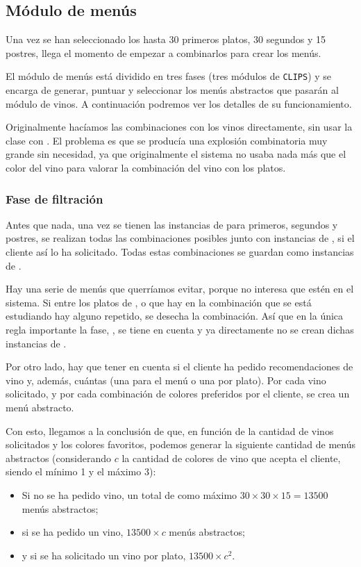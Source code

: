 % 

\subsection{Módulo de menús}
Una vez se han seleccionado los hasta 30 primeros platos, 30 segundos y 15
postres, llega el momento de empezar a combinarlos para crear los menús.

El módulo de menús está dividido en tres fases (tres módulos de \texttt{CLIPS})
y se encarga de generar, puntuar y seleccionar los menús abstractos que pasarán
al módulo de vinos. A continuación podremos ver los detalles de su
funcionamiento.

Originalmente hacíamos las combinaciones con los vinos directamente, sin usar
la clase  con . El problema es que se
producía una explosión combinatoria muy grande sin necesidad, ya que
originalmente el sistema no usaba nada más que el color del vino para valorar
la combinación del vino con los platos.

\subsubsection{Fase de filtración}
Antes que nada, una vez se tienen las instancias de  para
primeros, segundos y postres, se realizan todas las combinaciones posibles
junto con instancias de , si el cliente así lo ha
solicitado. Todas estas combinaciones se guardan como instancias de
.

Hay una serie de menús que querríamos evitar, porque no interesa que estén en
el sistema. Si entre los platos de ,  o
 que hay en la combinación que se está estudiando hay alguno
repetido, se desecha la combinación. Así que en la única regla importante la
fase, , se tiene en cuenta y ya directamente no se crean
dichas instancias de .

Por otro lado, hay que tener en cuenta si el cliente ha pedido recomendaciones
de vino y, además, cuántas (una para el menú o una por plato). Por cada vino
solicitado, y por cada combinación de colores preferidos por el cliente, se
crea un menú abstracto.

Con esto, llegamos a la conclusión de que, en función de la cantidad de vinos
solicitados y los colores favoritos, podemos generar la siguiente cantidad de
menús abstractos (considerando $c$ la cantidad de colores de vino que acepta el cliente, siendo el mínimo 1 y el máximo 3):
\begin{itemize}
\item Si no se ha pedido vino, un total de como máximo $30 \times 30 \times 15
  = 13500$ menús abstractos;
\item si se ha pedido un vino, $13500 \times c$ menús abstractos;
\item y si se ha solicitado un vino por plato, $13500 \times c^2$.
\end{itemize}

